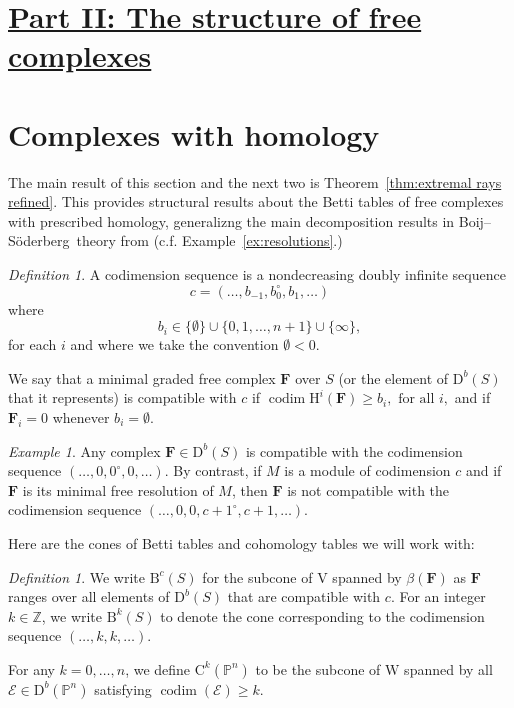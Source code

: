 \documentclass[12pt]{amsart}
\theoremstyle{definition}
\theoremstyle{remark}
\newtheorem{defn}[lemma]{Definition}
\newtheorem{example}[lemma]{Example}
\newcommand{\codim}{\operatorname{codim}}
\newcommand{\PP}{\mathbb{P}}
\newcommand{\HH}{\mathrm{H}}
\newcommand{\ZZ}{\mathbb{Z}}
\newcommand{\VV}{\mathrm{V}}
\newcommand{\WW}{\mathrm{W}}
\newcommand{\cc}{c}
\newcommand{\cE}{\mathcal{E}}
\newcommand{\FF}{\mathbf{F}}
\newcommand{\defi}[1]{\textsf{#1}} %
\newcommand{\zp}{\circ}
\newcommand{\nothing}{\emptyset}
\newcommand{\DD}{\mathrm{D}}
\newcommand{\CQ}{\mathrm{C}}
\newcommand{\BBQ}{\mathrm{B}}
\def\BS{Boij--S\"oderberg~}
\begin{document}
\section*{\underline{{Part II: The structure of free complexes}}}
\section{Complexes with homology}\label{sec:refined}
The main result of this section and the next two is Theorem~\ref{thm:extremal rays refined}.  This provides structural results about the Betti tables of free complexes with prescribed homology, generalizng the main decomposition results in \BS theory from \cites{eis-schrey1,boij-sod2} (c.f. Example~\ref{ex:resolutions}.)  

\begin{defn} A \defi{codimension sequence} is a nondecreasing
doubly infinite sequence
$$
\cc=(\dots, b_{-1}, b_{0}^{\circ}, b_{1}, \dots )
$$
where  
$$
b_{i}\in \{\nothing\} \cup \{0,1,\dots,n+1\}\cup \{\infty\},
$$
for each $i$ and where we take the convention $\nothing<0$.  

We say that a
minimal graded free complex $\FF$ over $S$ (or the element of $\DD^{b}(S)$ that it represents) is \defi{compatible with $\cc$} if 
$
\codim \HH^i(\FF) \geq b_i, \text{ for all } i,
$
and if $\FF_i=0$ whenever $b_i=\nothing$.
%
\end{defn}

\begin{example}
Any complex $\FF\in \DD^b(S)$ is compatible with the codimension sequence $(\dots, 0,0^\zp,0,\dots)$.  By contrast, if $M$ is a module of codimension $c$ and if $\FF$ is its minimal free resolution of $M$, then $\FF$ is not compatible with the codimension sequence $(\dots, 0,0,c+1^\zp,c+1,\dots)$.
\end{example}

Here are the cones of Betti tables and cohomology tables we will work with:
\begin{defn}\label{defn:cones}
We write $\BBQ^{\cc}(S)$ for the subcone of $\VV$ spanned by $\beta(\FF)$ as $\FF$ ranges over all elements of $\DD^b(S)$ that are compatible with $\cc$.  For an integer $k\in \ZZ$, we write $\BBQ^k(S)$ to denote the cone corresponding to the codimension sequence $(\dots, k,k,\dots)$.

For any $k=0, \dots, n$, we define $\CQ^k(\PP^n)$ to be the subcone of $\WW$ spanned by all $\cE\in \DD^b(\PP^n)$ satisfying $\codim(\cE)\geq k$.
\end{defn}
\end{document}
